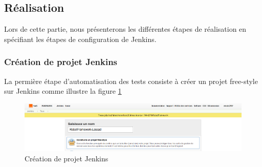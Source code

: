 \subsection{Réalisation}
Lors de cette partie, nous présenterons les différentes étapes de réalisation en spécifiant les étapes de configuration de Jenkins.\newpage
\subsubsection{Création de projet Jenkins}
La permière étape d'automatisation des tests consiste à créer un projet free-style sur Jenkins comme illustre la figure \ref{fig:creation-projet}
\begin{figure}[H]
	\centering
	\includegraphics[width=0.9\linewidth]{"img/jenkins/creation projet"}
	\caption[Création de projet Jenkins]{Création de projet Jenkins}
	\label{fig:creation-projet}
\end{figure}

